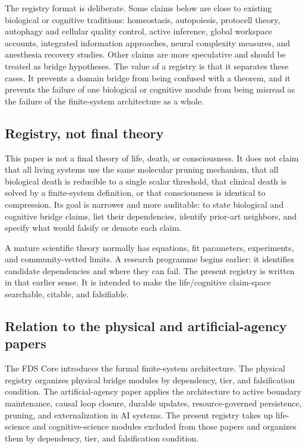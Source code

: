 \documentclass[10pt,a4paper,twocolumn,aps,prl]{revtex4-2}
\theoremstyle{claimstyle}
\theoremstyle{definition}
\newcommand{\FDS}{FDS}
\begin{document}
The registry format is deliberate. Some claims below are close to existing biological or cognitive traditions: homeostasis, autopoiesis, protocell theory, autophagy and cellular quality control, active inference, global workspace accounts, integrated information approaches, neural complexity measures, and anesthesia recovery studies. Other claims are more speculative and should be treated as bridge hypotheses. The value of a registry is that it separates these cases. It prevents a domain bridge from being confused with a theorem, and it prevents the failure of one biological or cognitive module from being misread as the failure of the finite-system architecture as a whole.

\subsection{Registry, not final theory}

This paper is not a final theory of life, death, or consciousness. It does not claim that all living systems use the same molecular pruning mechanism, that all biological death is reducible to a single scalar threshold, that clinical death is solved by a finite-system definition, or that consciousness is identical to compression. Its goal is narrower and more auditable: to state biological and cognitive bridge claims, list their dependencies, identify prior-art neighbors, and specify what would falsify or demote each claim.

A mature scientific theory normally has equations, fit parameters, experiments, and community-vetted limits. A research programme begins earlier: it identifies candidate dependencies and where they can fail. The present registry is written in that earlier sense. It is intended to make the life/cognitive claim-space searchable, citable, and falsifiable.

\subsection{Relation to the physical and artificial-agency papers}

The \FDS{} Core introduces the formal finite-system architecture. The physical registry organizes physical bridge modules by dependency, tier, and falsification condition. The artificial-agency paper applies the architecture to active boundary maintenance, causal loop closure, durable updates, resource-governed persistence, pruning, and externalization in AI systems. The present registry takes up life-science and cognitive-science modules excluded from those papers and organizes them by dependency, tier, and falsification condition.
\end{document}
